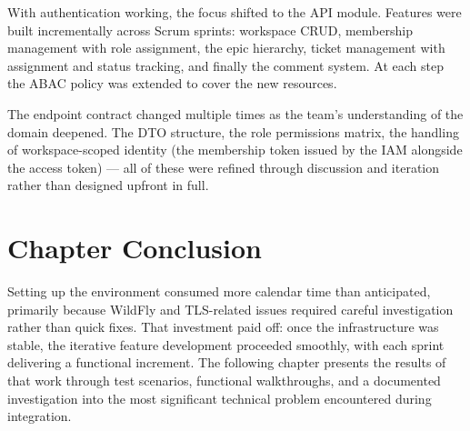 With authentication working, the focus shifted to the API module. Features were built
incrementally across Scrum sprints: workspace CRUD, membership management with role
assignment, the epic hierarchy, ticket management with assignment and status tracking,
and finally the comment system. At each step the ABAC policy was extended to cover the
new resources.

The endpoint contract changed multiple times as the team's understanding of the domain
deepened. The DTO structure, the role permissions matrix, the handling of workspace-scoped
identity (the membership token issued by the IAM alongside the access token) --- all of
these were refined through discussion and iteration rather than designed upfront in full.

\section{Chapter Conclusion}

Setting up the environment consumed more calendar time than anticipated, primarily because
WildFly and TLS-related issues required careful investigation rather than quick fixes.
That investment paid off: once the infrastructure was stable, the iterative feature
development proceeded smoothly, with each sprint delivering a functional increment. The
following chapter presents the results of that work through test scenarios, functional
walkthroughs, and a documented investigation into the most significant technical problem
encountered during integration.

